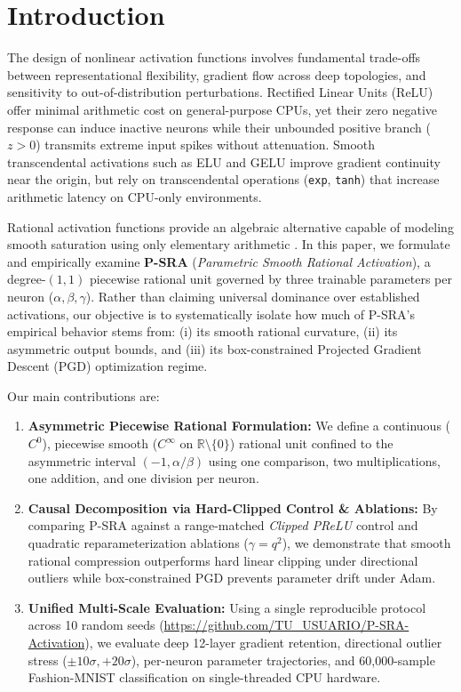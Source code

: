 \documentclass[conference]{IEEEtran}
\begin{document}
\section{Introduction}
The design of nonlinear activation functions involves fundamental trade-offs between representational flexibility, gradient flow across deep topologies, and sensitivity to out-of-distribution perturbations. Rectified Linear Units (ReLU) \cite{he2015delving} offer minimal arithmetic cost on general-purpose CPUs, yet their zero negative response can induce inactive neurons while their unbounded positive branch ($z > 0$) transmits extreme input spikes without attenuation. Smooth transcendental activations such as ELU \cite{clevert2016fast} and GELU \cite{hendrycks2016gaussian} improve gradient continuity near the origin, but rely on transcendental operations (\texttt{exp}, \texttt{tanh}) that increase arithmetic latency on CPU-only environments.

Rational activation functions provide an algebraic alternative capable of modeling smooth saturation using only elementary arithmetic \cite{elliott1993better, molina2020pade}. In this paper, we formulate and empirically examine \textbf{P-SRA} (\textit{Parametric Smooth Rational Activation}), a degree-$(1,1)$ piecewise rational unit governed by three trainable parameters per neuron ($\alpha, \beta, \gamma$). Rather than claiming universal dominance over established activations, our objective is to systematically isolate how much of P-SRA's empirical behavior stems from: (i) its smooth rational curvature, (ii) its asymmetric output bounds, and (iii) its box-constrained Projected Gradient Descent (PGD) optimization regime.

Our main contributions are:
\begin{enumerate}
    \item \textbf{Asymmetric Piecewise Rational Formulation:} We define a continuous ($C^0$), piecewise smooth ($C^\infty$ on $\mathbb{R}\setminus\{0\}$) rational unit confined to the asymmetric interval $(-1, \alpha/\beta)$ using one comparison, two multiplications, one addition, and one division per neuron.
    \item \textbf{Causal Decomposition via Hard-Clipped Control \& Ablations:} By comparing P-SRA against a range-matched \textit{Clipped PReLU} control and quadratic reparameterization ablations ($\gamma = q^2$), we demonstrate that smooth rational compression outperforms hard linear clipping under directional outliers while box-constrained PGD prevents parameter drift under Adam.
    \item \textbf{Unified Multi-Scale Evaluation:} Using a single reproducible protocol across 10 random seeds (\url{https://github.com/TU_USUARIO/P-SRA-Activation}), we evaluate deep 12-layer gradient retention, directional outlier stress ($\pm 10\sigma, +20\sigma$), per-neuron parameter trajectories, and 60,000-sample Fashion-MNIST classification on single-threaded CPU hardware.
\end{enumerate}
\end{document}
